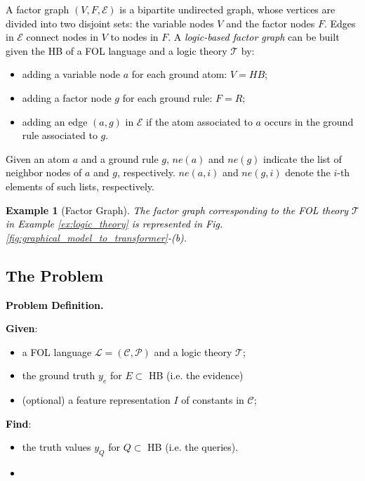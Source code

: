 \documentclass[journal]{IEEEtran}
\newtheorem{example}{Example}
\newcommand{\mc}{\mathcal}
\newcommand{\fg}[1]{\textcolor{blue}{#1}}
\newcommand{\ar}[1]{\textcolor{black}{#1}}
\begin{document}
\ar{A factor graph $(V,F,\mc{E})$ is a bipartite undirected graph, whose vertices are divided into two disjoint sets: the variable nodes $V$ and the factor nodes $F$. Edges in $\mc{E}$ connect nodes in $V$ to nodes in $F$. A \textit{logic-based factor graph} can be built given the HB of a FOL language and a logic theory $\mathcal{T}$ by:
\begin{itemize}
\item adding a variable node $a$ for each ground atom: $V=HB$; %
\item adding a factor node $g$ for each ground rule: $F=R$; %
\item adding an edge $(a,g)$ in $\mc{E}$ if the atom associated to $a$ occurs in the ground rule associated to $g$.
\end{itemize} }
\noindent\ar{Given an atom $a$ and a ground rule $g$, $ne(a)$ and $ne(g)$ indicate the list of neighbor nodes of $a$ and $g$, respectively. $ne(a,i)$ and $ne(g,i)$ denote the $i$-th elements of such lists, respectively.}
\ar{\begin{example}[Factor Graph]
The factor graph corresponding to the FOL theory $\mathcal{T}$ in Example \ref{ex:logic_theory} is represented in Fig. \ref{fig:graphical_model_to_transformer}-(b). 
\end{example}}

\ar{\section{The Problem}
\label{sec:problem}}
\noindent\ar{\textbf{Problem Definition. }}
\ar{\textbf{Given}:
\begin{itemize}
    \item a FOL language $\mathcal{L} = (\mathcal{C}, \mathcal{P})$ and a logic theory $\mathcal{T}$;
    \item the ground truth $y_e$ for $E \subset$ HB (i.e. the evidence)
    \item (optional) a feature representation $I$ of constants in $\mathcal{C}$;
\end{itemize}}

\ar{\textbf{Find}:
\begin{itemize}
    \item the truth values $y_Q$ for $Q \subset$ HB (i.e. the queries).
    \item[]
\end{itemize}
}
\end{document}
